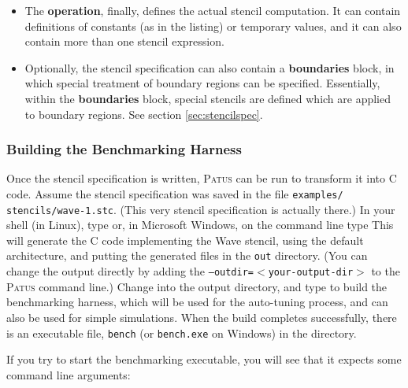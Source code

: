 \begin{itemize}
  \item The \textbf{operation}, finally, defines the actual stencil computation.
    It can contain definitions of constants (as in the listing) or temporary values, and it can also contain more than
    one stencil expression.
  
  \item Optionally, the stencil specification can also contain a \textbf{boundaries} block, in which
    special treatment of boundary regions can be specified. Essentially, within the \textbf{boundaries} block,
    special stencils are defined which are applied to boundary regions. See section \ref{sec:stencilspec}.
\end{itemize}


\subsubsection{Building the Benchmarking Harness}

Once the stencil specification is written, \textsc{Patus} can be run to transform it into C code.
Assume the stencil specification was saved in the file \texttt{examples/ stencils/wave-1.stc}.
(This very stencil specification is actually there.)
In your shell (in Linux), type
or, in Microsoft Windows, on the command line type
This will generate the C code implementing the Wave stencil, using the default architecture,
and putting the generated files in the
\texttt{out} directory. (You can change the output directly by adding the \texttt{--outdir=$<$your-output-dir$>$}
to the \textsc{Patus} command line.)
Change into the output directory, 
and type  to build the benchmarking harness, which will be used for the auto-tuning process, and can also be
used for simple simulations. When the build completes successfully, there is an executable file,
\texttt{bench} (or \texttt{bench.exe} on Windows) in the directory.

If you try to start the benchmarking executable, you will see that it expects some command line arguments:

